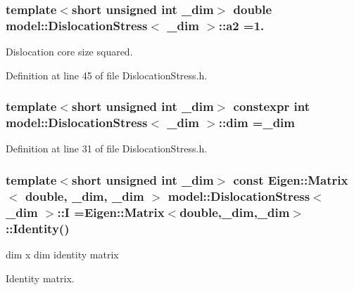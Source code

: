 \subsubsection[{a2}]{\setlength{\rightskip}{0pt plus 5cm}template$<$short unsigned int \+\_\+dim$>$ double {\bf model\+::\+Dislocation\+Stress}$<$ \+\_\+dim $>$\+::a2 =1.\hspace{0.3cm}{\ttfamily [static]}}\label{structmodel_1_1_dislocation_stress_a5f7535a11c63e1ce41853b3c645e49ef}


Dislocation core size squared. 



Definition at line 45 of file Dislocation\+Stress.\+h.

\hypertarget{structmodel_1_1_dislocation_stress_acd45411c1dd348187e8a3ecdda35d793}{}
\subsubsection[{dim}]{\setlength{\rightskip}{0pt plus 5cm}template$<$short unsigned int \+\_\+dim$>$ constexpr int {\bf model\+::\+Dislocation\+Stress}$<$ \+\_\+dim $>$\+::dim =\+\_\+dim\hspace{0.3cm}{\ttfamily [static]}}\label{structmodel_1_1_dislocation_stress_acd45411c1dd348187e8a3ecdda35d793}


Definition at line 31 of file Dislocation\+Stress.\+h.

\hypertarget{structmodel_1_1_dislocation_stress_a0a408e1c7332c94d8054a57a92094989}{}
\subsubsection[{I}]{\setlength{\rightskip}{0pt plus 5cm}template$<$short unsigned int \+\_\+dim$>$ const Eigen\+::\+Matrix$<$ double, \+\_\+dim, \+\_\+dim $>$ {\bf model\+::\+Dislocation\+Stress}$<$ \+\_\+dim $>$\+::I =Eigen\+::\+Matrix$<$double,\+\_\+dim,\+\_\+dim$>$\+::Identity()\hspace{0.3cm}{\ttfamily [static]}}\label{structmodel_1_1_dislocation_stress_a0a408e1c7332c94d8054a57a92094989}


dim x dim identity matrix 

Identity matrix. 


